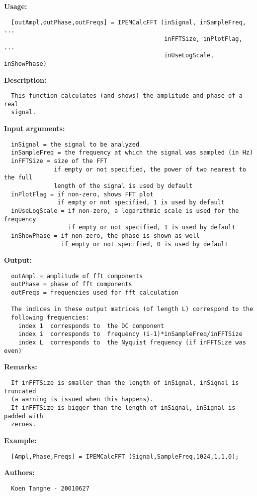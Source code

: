 \textbf{Usage:}
\begin{verbatim}  [outAmpl,outPhase,outFreqs] = IPEMCalcFFT (inSignal, inSampleFreq, ...
                                             inFFTSize, inPlotFlag, ...
                                             inUseLogScale, inShowPhase)

\end{verbatim}
\textbf{Description:}
\begin{verbatim}  This function calculates (and shows) the amplitude and phase of a real
  signal.

\end{verbatim}
\textbf{Input arguments:}
\begin{verbatim}  inSignal = the signal to be analyzed
  inSampleFreq = the frequency at which the signal was sampled (in Hz)
  inFFTSize = size of the FFT 
              if empty or not specified, the power of two nearest to the full
              length of the signal is used by default
  inPlotFlag = if non-zero, shows FFT plot
               if empty or not specified, 1 is used by default
  inUseLogScale = if non-zero, a logarithmic scale is used for the frequency
                  if empty or not specified, 1 is used by default
  inShowPhase = if non-zero, the phase is shown as well
                if empty or not specified, 0 is used by default

\end{verbatim}
\textbf{Output:}
\begin{verbatim}  outAmpl = amplitude of fft components
  outPhase = phase of fft components
  outFreqs = frequencies used for fft calculation
  
  The indices in these output matrices (of length L) correspond to the
  following frequencies:
    index 1  corresponds to  the DC component
    index i  corresponds to  frequency (i-1)*inSampleFreq/inFFTSize
    index L  corresponds to  the Nyquist frequency (if inFFTSize was even)

\end{verbatim}
\textbf{Remarks:}
\begin{verbatim}  If inFFTSize is smaller than the length of inSignal, inSignal is truncated
  (a warning is issued when this happens).
  If inFFTSize is bigger than the length of inSignal, inSignal is padded with
  zeroes.

\end{verbatim}
\textbf{Example:}
\begin{verbatim}  [Ampl,Phase,Freqs] = IPEMCalcFFT (Signal,SampleFreq,1024,1,1,0);

\end{verbatim}
\textbf{Authors:}
\begin{verbatim}  Koen Tanghe - 20010627
\end{verbatim}


